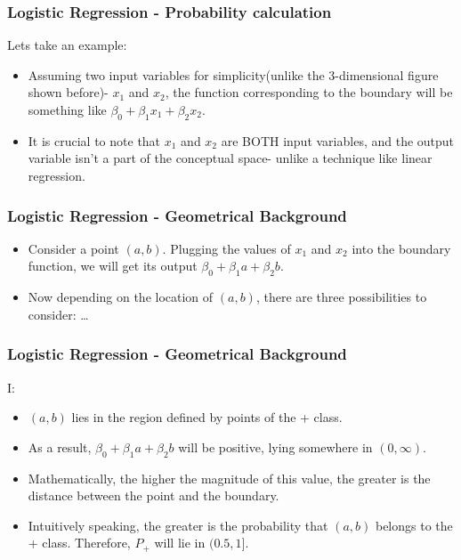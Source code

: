 \begin{frame}[fragile]\frametitle{Logistic Regression - Probability calculation}
Lets take an example:
\begin{itemize}
\item Assuming two input variables for simplicity(unlike the 3-dimensional figure shown before)- $x_1$ and $x_2$, the function corresponding to the boundary will be something like $\beta_0 + \beta_1 x_1 + \beta_2 x_2$.

\item It is crucial to note that $x_1$ and $x_2$ are BOTH input variables, and the output variable isn't a part of the conceptual space- unlike a technique like linear regression.
\end{itemize}

\end{frame}


\begin{frame}[fragile]\frametitle{Logistic Regression - Geometrical Background}
\begin{itemize}
\item Consider a point $(a, b)$. Plugging the values of  $x_1$ and $x_2$ into the boundary function, we will get its output $\beta_0 + \beta_1 a + \beta_2 b$.

\item Now depending on the location of $(a, b)$, there are three possibilities to consider: \ldots

\end{itemize}

\end{frame}

\begin{frame}[fragile]\frametitle{Logistic Regression - Geometrical Background}
I:
\begin{itemize}
\item $(a, b)$ lies in the region defined by points of the + class. 
\item As a result, $\beta_0 + \beta_1 a + \beta_2 b$ will be positive, lying somewhere in $(0, \infty)$. 
\item Mathematically, the higher the magnitude of this value, the greater is the distance between the point and the boundary. 
\item Intuitively speaking, the greater is the probability that $(a, b)$ belongs to the + class. Therefore, $P_+$ will lie in $(0.5, 1]$.

\end{itemize}

\end{frame}

